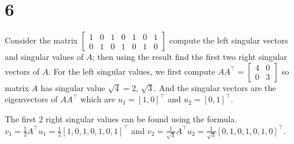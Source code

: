\documentclass{article}
\begin{document}
\section*{6}

\begin{myleftlinebox}
    Consider the matrix \(\begin{bmatrix}
        1 & 0 & 1 & 0 & 1 & 0 & 1\\
        0 & 1 & 0 & 1 & 0 & 1 & 0
    \end{bmatrix}\) compute the left singular vectors and singular values of \(A\); then using the result find the first two right singular vectors of \(A\).
    \tcblower
    For the left singular values, we first compute \(AA^\top=\begin{bmatrix}
        4 & 0\\
        0 & 3
    \end{bmatrix}\) so matrix \(A\) has singular value \(\sqrt 4=2\), \( \sqrt 3\). And the singular vectors are the eigenvectors of \(AA^\top\) which are \(u_1=[1,0]^\top\) and \(u_2=[0,1]^\top\). 

    The first 2 right singular values can be found using the formula. \(v_1 = \frac{1}{2}A^\top u_1 = \frac{1}{2}[1,0,1,0,1,0,1]^\top\) and \(v_2 = \frac{1}{\sqrt 3}A^\top u_2 = \frac{1}{\sqrt 3}[0,1,0,1,0,1,0]^\top\).
\end{myleftlinebox}


%
%

\end{document}
